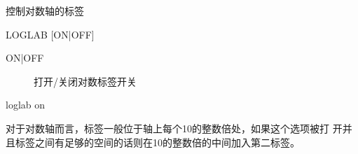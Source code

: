 \label{cmd:loglab}

控制对数轴的标签

\begin{SACSTX}
LOGLAB [ON|OFF]
\end{SACSTX}

\begin{description}
\item [ON|OFF] 打开/关闭对数标签开关
\end{description}

\begin{SACDFT}
loglab on
\end{SACDFT}

对于对数轴而言，标签一般位于轴上每个10的整数倍处，如果这个选项被打
开并且标签之间有足够的空间的话则在10的整数倍的中间加入第二标签。
